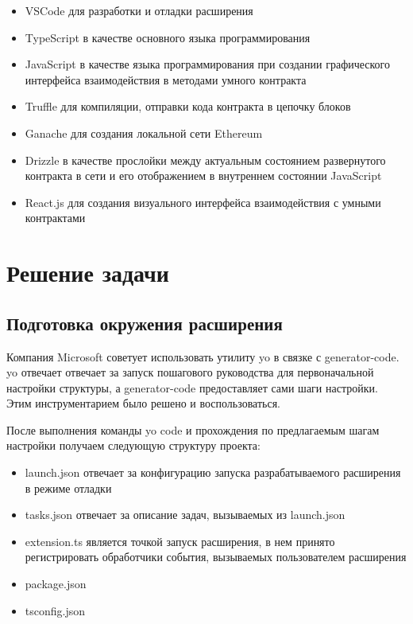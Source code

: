 \documentclass[a4paper,12pt]{diplom}
\begin{document}
\begin{itemize}
  \item VSCode для разработки и отладки расширения
  \item TypeScript в качестве основного языка программирования
  \item JavaScript в качестве языка программирования при создании графического интерфейса взаимодействия в методами умного контракта
  \item Truffle для компиляции, отправки кода контракта в цепочку блоков
  \item Ganache для создания локальной сети Ethereum
  \item Drizzle в качестве прослойки между актуальным состоянием развернутого контракта в сети и его отображением в внутреннем состоянии JavaScript
  \item React.js для создания визуального интерфейса взаимодействия с умными контрактами 
\end{itemize}

\chapter{Решение задачи}

\section{Подготовка окружения расширения}

Компания Microsoft советует использовать утилиту yo в связке с generator-code. yo отвечает отвечает за запуск пошагового руководства
для первоначальной настройки структуры, а generator-code предоставляет сами шаги настройки. Этим инструментарием было решено и воспользоваться.

После выполнения команды yo code и прохождения по предлагаемым шагам настройки получаем следующую структуру проекта:

\renewcommand*\DTstyle{\ttfamily\textcolor{black}}

\begin{itemize}
  \item launch.json отвечает за конфигурацию запуска разрабатываемого расширения в режиме отладки
  \item tasks.json отвечает за описание задач, вызываемых из launch.json
  \item extension.ts является точкой запуск расширения, в нем принято регистрировать обработчики события,
  вызываемых пользователем расширения
  \item package.json
  \item tsconfig.json
\end{itemize}
\end{document}

